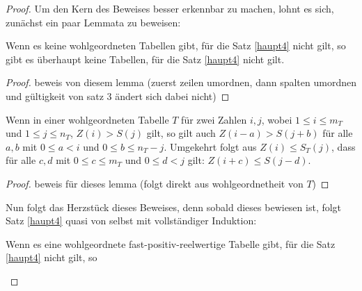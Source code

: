 \begin{proof}
    Um den Kern des Beweises besser erkennbar zu machen, lohnt es sich, zunächst ein paar Lemmata zu beweisen:
    \renewcommand{\qedsymbol}{$\square$}
    \begin{lem}\label{fallbeschrank}
        Wenn es keine wohlgeordneten Tabellen gibt, für die Satz \ref{haupt4} nicht gilt, so gibt es überhaupt keine 
        Tabellen, für die Satz \ref{haupt4} nicht gilt.
    \end{lem}
    \begin{proof}
        beweis von diesem lemma (zuerst zeilen umordnen, dann spalten umordnen und gültigkeit von satz 3 ändert sich 
        dabei nicht) %
    \end{proof}
    \begin{lem}\label{rechteckkke}
        Wenn in einer wohlgeordneten Tabelle $T$ für zwei Zahlen $i, j$, wobei $1 \leq i \leq m_T$ und $1 \leq j \leq 
        n_T$, $Z(i) > S(j)$ gilt, so gilt auch $Z(i-a) > S(j+b)$ für alle $a, b$ mit $0 \leq a < i$ und $0 \leq b 
        \leq n_T-j$. Umgekehrt folgt aus $Z(i) \leq S_T(j)$, dass für alle $c,d$ mit $0 \leq c \leq m_T$ und
        $0 \leq d < j$ gilt: $Z(i+c) \leq S(j-d)$. 
    \end{lem}
    \begin{proof}
        beweis für dieses lemma (folgt direkt aus wohlgeordnetheit von $T$)%
    \end{proof}
    Nun folgt das Herzstück dieses Beweises, denn sobald dieses bewiesen ist, folgt Satz \ref{haupt4} quasi von selbst 
    mit vollständiger Induktion:
    \begin{lem}
        Wenn es eine wohlgeordnete fast-positiv-reelwertige Tabelle gibt, für die Satz \ref{haupt4} nicht gilt, so 
        

\end{lem}
\end{proof}
